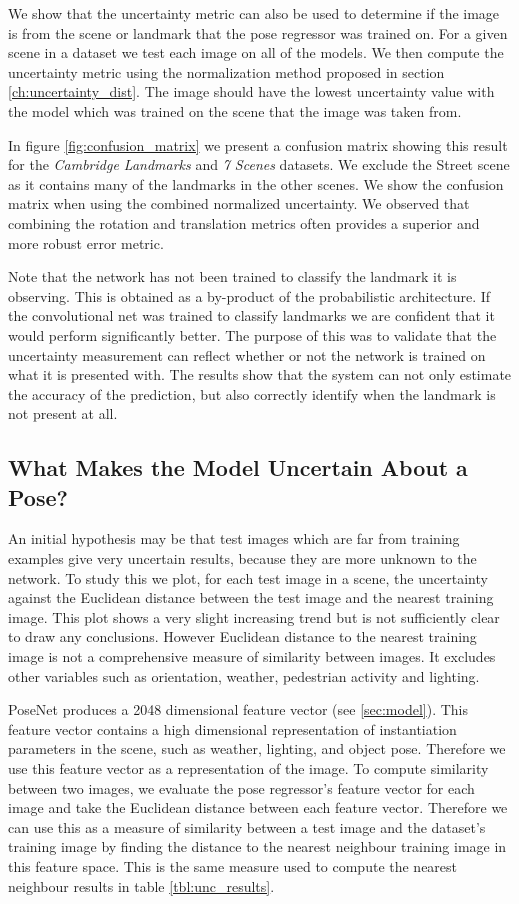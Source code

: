 We show that the uncertainty metric can also be used to determine if the image is from the scene or landmark that the pose regressor was trained on. For a given scene in a dataset we test each image on all of the models. We then compute the uncertainty metric using the normalization method proposed in section \ref{ch:uncertainty_dist}. The image should have the lowest uncertainty value with the model which was trained on the scene that the image was taken from.

In figure \ref{fig:confusion_matrix} we present a confusion matrix showing this result for the \textit{Cambridge Landmarks} and \textit{7 Scenes} datasets. We exclude the Street scene as it contains many of the landmarks in the other scenes. We show the confusion matrix when using the combined normalized uncertainty. We observed that combining the rotation and translation metrics often provides a superior and more robust error metric.

Note that the network has not been trained to classify the landmark it is observing. This is obtained as a by-product of the probabilistic architecture. If the convolutional net was trained to classify landmarks we are confident that it would perform significantly better. The purpose of this was to validate that the uncertainty measurement can reflect whether or not the network is trained on what it is presented with. The results show that the system can not only estimate the accuracy of the prediction, but also correctly identify when the landmark is not present at all.

\subsection{What Makes the Model Uncertain About a Pose?}

An initial hypothesis may be that test images which are far from training examples give very uncertain results, because they are more unknown to the network. To study this we plot, for each test image in a scene, the uncertainty against the Euclidean distance between the test image and the nearest training image. This plot shows a very slight increasing trend but is not sufficiently clear to draw any conclusions. However Euclidean distance to the nearest training image is not a comprehensive measure of similarity between images. It excludes other variables such as orientation, weather, pedestrian activity and lighting. 

PoseNet produces a 2048 dimensional feature vector (see \cref{sec:model}). This feature vector contains a high dimensional representation of instantiation parameters in the scene, such as weather, lighting, and object pose. Therefore we use this feature vector as a representation of the image. To compute similarity between two images, we evaluate the pose regressor's feature vector for each image and take the Euclidean distance between each feature vector. Therefore we can use this as a measure of similarity between a test image and the dataset's training image by finding the distance to the nearest neighbour training image in this feature space. This is the same measure used to compute the nearest neighbour results in table \ref{tbl:unc_results}.

